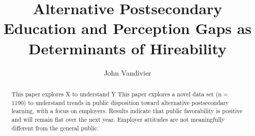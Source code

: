 \documentclass[review]{elsarticle}
\begin{document}
\begin{frontmatter}

    \title{
        Alternative Postsecondary Education and Perception Gaps as Determinants of Hireability
    }

    \author[mymainaddress]{John Vandivier}
    \address[mymainaddress]{4400 University Dr, Fairfax, VA 22030}

    \begin{abstract}
        This paper explores X to understand Y
        This paper explores a novel data set (n = 1190) to understand trends in public
        disposition toward alternative postsecondary learning, with a focus on employers.
        Results indicate that public favorability is positive and will remain flat over the next year.
        Employer attitudes are not meaningfully different from the general public.


\end{abstract}
\end{frontmatter}
\end{document}
